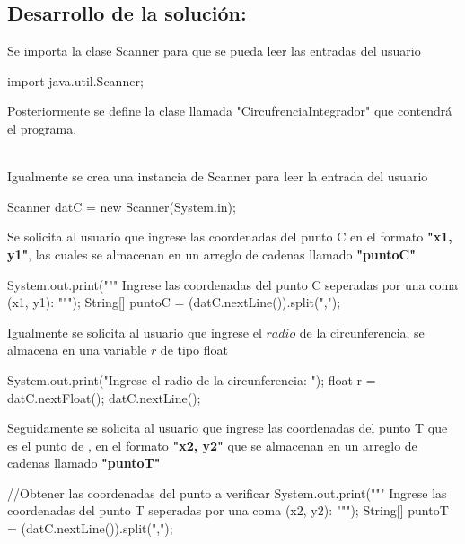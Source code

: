 \subsection{\textbf{Desarrollo de la solución:}}

Se importa la clase Scanner para que se pueda leer las entradas del usuario
\begin{javaCode}
import java.util.Scanner;
\end{javaCode}

Posteriormente se define la clase llamada "CircufrenciaIntegrador" que contendrá el programa.
\begin{javaCode}
    public class CircuferenciaIntegrador {
    public static void main(String[] args) {} 
\end{javaCode}\\

Igualmente se crea una instancia de Scanner para leer la entrada del usuario
\begin{javaCode}
Scanner datC = new Scanner(System.in);
\end{javaCode}

Se solicita al usuario que ingrese las coordenadas del punto C en el formato \textbf{"x1, y1"}, las cuales se almacenan en un arreglo de cadenas llamado \textbf{"puntoC"}
\begin{javaCode}
System.out.print("""
                Ingrese las coordenadas del punto C 
                seperadas por una coma (x1, y1):
                         """);
    String[] puntoC = (datC.nextLine()).split(",");
\end{javaCode}

Igualmente se solicita al usuario que ingrese el $radio$ de la circunferencia, se almacena en una variable $r$ de tipo float
\begin{javaCode}
System.out.print("Ingrese el radio de la circunferencia: ");
    float r = datC.nextFloat();
    datC.nextLine();  
\end{javaCode}

Seguidamente se solicita al usuario que ingrese las coordenadas del punto T que es el punto de , en el formato \textbf{"x2, y2"} que se almacenan en un arreglo de cadenas llamado \textbf{"puntoT"}
\begin{javaCode}
//Obtener las coordenadas del punto a verificar
System.out.print("""
                Ingrese las coordenadas del punto T
                seperadas por una coma (x2, y2): 
                         """);
String[] puntoT = (datC.nextLine()).split(",");
\end{javaCode}

